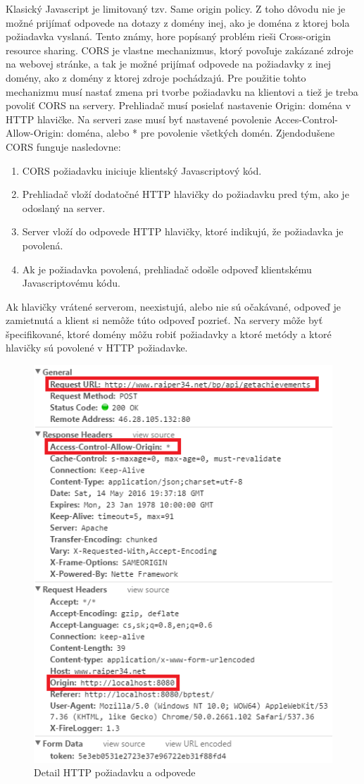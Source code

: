 Klasický Javascript je limitovaný tzv. Same origin policy. Z toho dôvodu nie je možné prijímať odpovede na dotazy z domény inej, ako je doména z ktorej bola požiadavka vyslaná. Tento známy, hore popísaný problém rieši Cross-origin resource sharing. CORS je vlastne mechanizmus, ktorý povoľuje zakázané zdroje na webovej stránke, a tak je možné prijímať odpovede na požiadavky z inej domény, ako z domény z ktorej zdroje pochádzajú. Pre použitie tohto mechanizmu musí nastať zmena pri tvorbe požiadavku na klientovi a tiež je treba povoliť CORS na servery. Prehliadač musí posielať nastavenie Origin: doména v HTTP hlavičke. Na serveri zase musí byť nastavené povolenie Acces-Control-Allow-Origin: doména, alebo * pre povolenie všetkých domén. Zjendodušene CORS funguje nasledovne: 
\begin{enumerate}
\item CORS požiadavku iniciuje klientský Javascriptový kód.
\item Prehliadač vloží dodatočné HTTP hlavičky do požiadavku pred tým, ako je odoslaný na server.
\item Server vloží do odpovede HTTP hlavičky, ktoré indikujú, že požiadavka je povolená.
\item Ak je požiadavka povolená, prehliadač odošle odpoveď klientskému Javascriptovému kódu.
\end{enumerate}
Ak hlavičky vrátené serverom, neexistujú, alebo nie sú očakávané, odpoveď je zamietnutá a klient si nemôže túto odpoveď pozrieť. Na servery môže byť špecifikované, ktoré domény môžu robiť požiadavky a ktoré metódy a ktoré hlavičky sú povolené v HTTP požiadavke. 
\begin{figure}[h]
  \centering
  \includegraphics[scale=0.70]{fig/cors-example.png}
  \caption{Detail HTTP požiadavku a odpovede}
  \label{fig:cors-example}
\end{figure}

